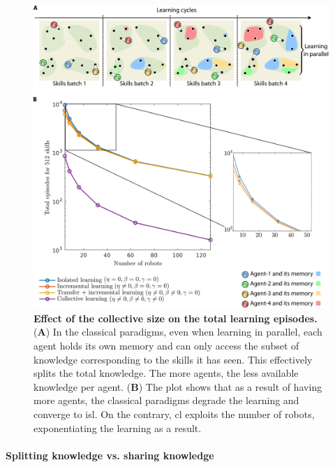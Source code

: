\documentclass[12pt]{article}
\begin{document}
\begin{figure}[t!]
	\centering
	\hspace*{\fill}
	\includegraphics[width=16cm]{learning_paradigms_and_size_of_collective.png}
	\hspace*{\fill}
	\caption[] {\label{fig:learning_paradigms_and_size_of_collective} \textbf{Effect of the collective size on the total learning episodes.} {(\textbf{A}) In the classical paradigms, even when learning in parallel, each agent holds its own memory and can only access the subset of knowledge corresponding to the skills it has seen. This effectively splits the total knowledge. The more agents, the less available knowledge per agent. (\textbf{B}) The plot shows that as a result of having more agents, the classical paradigms degrade the learning and converge to \acl{isl}. On the contrary, \acl{cl} exploits the number of robots, exponentiating the learning as a result.}}
\end{figure}

\paragraph*{Splitting knowledge vs. sharing knowledge}
\end{document}
